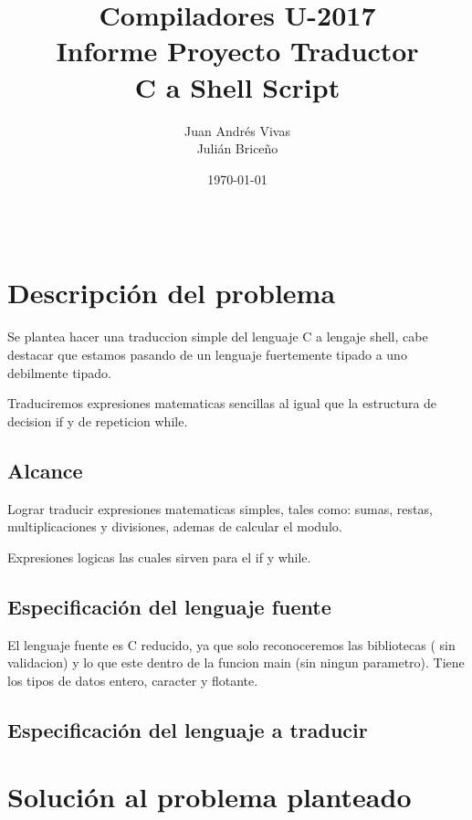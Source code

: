 \documentclass[aspectratio=169]{article}
\title{Compiladores U-2017 \\ Informe Proyecto Traductor \\ C a Shell Script} %
\author{Juan Andr\'es Vivas\\
		Juli\'an Brice\~no} %
\date{\today} %
\begin{document}
\maketitle %

\begin{center}
\begin{tabular}{l r}

\end{tabular}
\end{center}

\newpage

\section{Descripci\'on del problema}

	Se plantea hacer una traduccion simple del lenguaje C a lengaje shell, cabe destacar que estamos
	pasando de un lenguaje fuertemente tipado a uno debilmente tipado.

	Traduciremos expresiones matematicas sencillas al igual que la estructura de decision if
	y de repeticion while.


\subsection{Alcance}

	Lograr traducir expresiones matematicas simples, tales como: sumas, restas, multiplicaciones
	y divisiones, ademas de calcular el modulo.

	Expresiones logicas las cuales sirven para el if y while.

\subsection{Especificaci\'on del lenguaje fuente}

	El lenguaje fuente es C reducido, ya que solo reconoceremos las bibliotecas ( sin validacion) y
	lo que este dentro de la funcion main (sin ningun parametro). Tiene los tipos de datos entero,
	caracter y flotante.



\subsection{Especificaci\'on del lenguaje a traducir}

\section{Soluci\'on al problema planteado}
\end{document}
